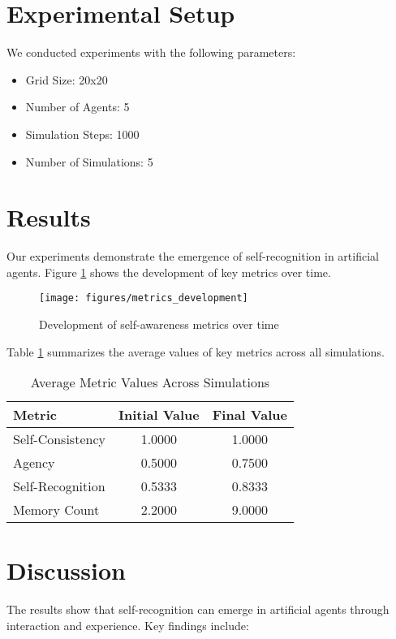 \documentclass[conference]{IEEEtran}
\begin{document}
\section{Experimental Setup}
We conducted experiments with the following parameters:
\begin{itemize}
    \item Grid Size: 20x20
    \item Number of Agents: 5
    \item Simulation Steps: 1000
    \item Number of Simulations: 5
\end{itemize}

\section{Results}
Our experiments demonstrate the emergence of self-recognition in artificial agents. Figure \ref{fig:metrics} shows the development of key metrics over time.

\begin{figure}[!t]
    \centering
    \texttt{[image: figures/metrics\_development]}
    \caption{Development of self-awareness metrics over time}
    \label{fig:metrics}
\end{figure}

Table \ref{tab:results} summarizes the average values of key metrics across all simulations.

\begin{table}[!t]
    \caption{Average Metric Values Across Simulations}
    \label{tab:results}
    \centering
    \begin{tabular}{lcc}
        \toprule
        Metric & Initial Value & Final Value \\
        \midrule
        Self-Consistency & 1.0000 & 1.0000 \\
        Agency & 0.5000 & 0.7500 \\
        Self-Recognition & 0.5333 & 0.8333 \\
        Memory Count & 2.2000 & 9.0000 \\
        \bottomrule
    \end{tabular}
\end{table}

\section{Discussion}
The results show that self-recognition can emerge in artificial agents through interaction and experience. Key findings include:
\end{document}
